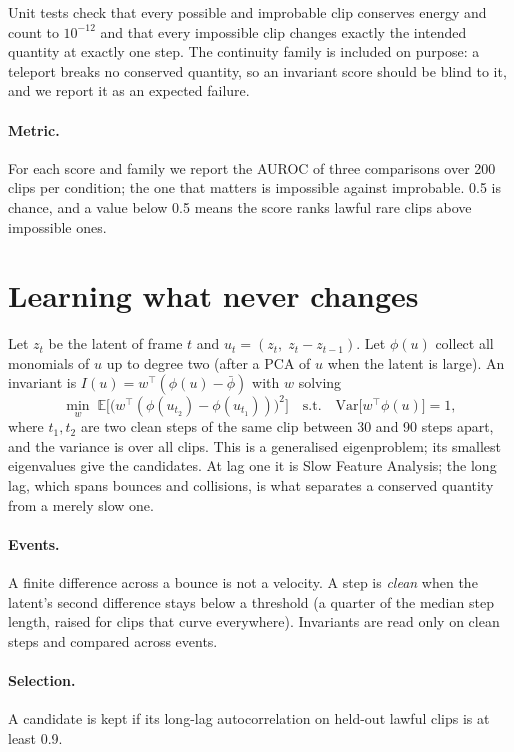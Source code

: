 \documentclass[11pt]{article}
\begin{document}
Unit tests check that every possible and improbable clip conserves energy and count to $10^{-12}$
and that every impossible clip changes exactly the intended quantity at exactly one step. The
continuity family is included on purpose: a teleport breaks no conserved quantity, so an invariant
score should be blind to it, and we report it as an expected failure.

\paragraph{Metric.} For each score and family we report the AUROC of three comparisons over 200
clips per condition; the one that matters is impossible against improbable. 0.5 is chance, and a
value below 0.5 means the score ranks lawful rare clips above impossible ones.

\section{Learning what never changes}\label{sec:method}

Let $z_t$ be the latent of frame $t$ and $u_t = (z_t,\; z_t - z_{t-1})$. Let $\phi(u)$ collect all
monomials of $u$ up to degree two (after a PCA of $u$ when the latent is large). An invariant is
$I(u) = w^\top (\phi(u) - \bar\phi)$ with $w$ solving
\begin{equation}
  \min_w \; \mathbb{E}\big[\big(w^\top(\phi(u_{t_2}) - \phi(u_{t_1}))\big)^2\big]
  \quad \text{s.t.} \quad \mathrm{Var}\big[w^\top \phi(u)\big] = 1,
\end{equation}
where $t_1, t_2$ are two clean steps of the same clip between 30 and 90 steps apart, and the
variance is over all clips. This is a generalised eigenproblem; its smallest eigenvalues give the
candidates. At lag one it is Slow Feature Analysis; the long lag, which spans bounces and
collisions, is what separates a conserved quantity from a merely slow one.

\paragraph{Events.} A finite difference across a bounce is not a velocity. A step is \emph{clean}
when the latent's second difference stays below a threshold (a quarter of the median step length,
raised for clips that curve everywhere). Invariants are read only on clean steps and compared
across events.

\paragraph{Selection.} A candidate is kept if its long-lag autocorrelation on held-out lawful clips
is at least 0.9.
\end{document}
